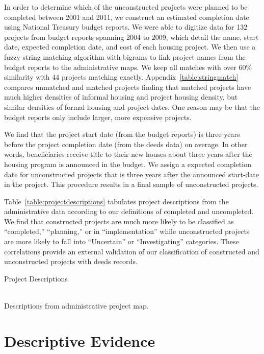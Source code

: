 \documentclass[12pt]{article}
\begin{document}
In order to determine which of the unconstructed projects were planned to be completed between 2001 and 2011, we construct an estimated completion date using National Treasury budget reports.  We were able to digitize data for 132 projects from budget reports spanning 2004 to 2009, which detail the name, start date, expected completion date, and cost of each housing project.  We then use a fuzzy-string matching algorithm with bigrams to link project names from the budget reports to the administrative maps.  We keep all matches with over 60\% similarity with 44 projects matching exactly.  Appendix~\ref{table:stringmatch} compares unmatched and matched projects finding that matched projects have much higher densities of informal housing and project housing density, but similar densities of formal housing and project dates.  One reason may be that the budget reports only include larger, more expensive projects.

We find that the project start date (from the budget reports) is three years before the project completion date (from the deeds data) on average.  In other words, beneficiaries receive title to their new houses about three years after the housing program is announced in the budget.  We assign a expected completion date for unconstructed projects that is three years after the announced start-date in the project.  This procedure results in a final sample of  unconstructed projects.

Table~\ref{table:projectdescriptions} tabulates project descriptions from the administrative data according to our definitions of completed and uncompleted.  We find that constructed projects are much more likely to be classified as ``completed,'' ``planning,'' or in ``implementation'' while unconstructed projects are more likely to fall into ``Uncertain'' or ``Investigating'' categories.  These correlations provide an external validation of our classification of constructed and unconstructed projects with deeds records.

\begin{table}
\centering
\caption{Project Descriptions}\label{table:projectdescriptions}
\\
\vspace{.2cm}
\footnotesize{Descriptions from administrative project map.}
\end{table}


\section{Descriptive Evidence}\label{section:descriptives}
\end{document}
